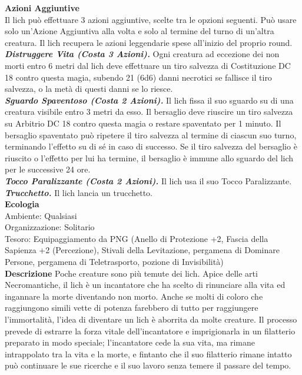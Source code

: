 \begin{multicols}{2}
\textbf{Azioni Aggiuntive}\\

Il lich può effettuare 3 azioni aggiuntive, scelte tra le opzioni seguenti. Può usare solo un'Azione Aggiuntiva alla volta e solo al termine del turno di un'altra creatura. Il lich recupera le azioni leggendarie spese all'inizio del proprio round.\\

\emph{\textbf{Distruggere Vita (Costa 3 Azioni).}} Ogni creatura ad eccezione dei non morti entro 6 metri dal lich deve effettuare un tiro salvezza di Costituzione DC 18 contro questa magia, subendo 21 (6d6) danni necrotici se fallisce il tiro salvezza, o la metà di questi danni se lo riesce.\\

\emph{\textbf{Sguardo Spaventoso (Costa 2 Azioni).}} Il lich fissa il suo sguardo su di una creatura visibile entro 3 metri da esso. Il bersaglio deve riuscire un tiro salvezza su Arbitrio DC 18 contro questa magia o restare spaventato per 1 minuto. Il bersaglio spaventato può ripetere il tiro salvezza al termine di ciascun suo turno, terminando l'effetto su di sé in caso di successo. Se il tiro salvezza del bersaglio è riuscito o l'effetto per lui ha termine, il bersaglio è immune allo sguardo del lich per le successive 24 ore.\\

\emph{\textbf{Tocco Paralizzante (Costa 2 Azioni).}} Il lich usa il suo Tocco Paralizzante.\\

\emph{\textbf{Trucchetto.}} Il lich lancia un trucchetto.\\

\textbf{Ecologia}\\
Ambiente: Qualsiasi\\
Organizzazione: Solitario\\
Tesoro: Equipaggiamento da PNG (Anello di Protezione +2, Fascia della Sapienza +2 (Percezione), Stivali della Levitazione, pergamena di Dominare Persone, pergamena di Teletrasporto, pozione di Invisibilità)\\

\textbf{Descrizione}
Poche creature sono più temute dei lich. Apice delle arti Necromantiche, il lich è un incantatore che ha scelto di rinunciare alla vita ed ingannare la morte diventando non morto. Anche se molti di coloro che raggiungono simili vette di potenza farebbero di tutto per raggiungere l’immortalità, l’idea di diventare un lich è aborrita da molte creature. Il processo prevede di estrarre la forza vitale dell’incantatore e imprigionarla in un filatterio preparato in modo speciale; l’incantatore cede la sua vita, ma rimane intrappolato tra la vita e la morte, e fintanto che il suo filatterio rimane intatto può continuare le sue ricerche e il suo lavoro senza temere il passare del tempo.\\



\end{multicols}
